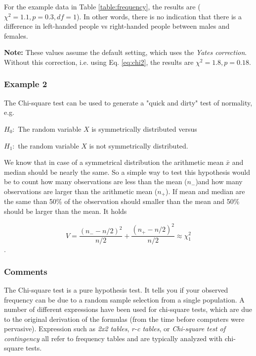 For the example data in Table \ref{table:frequency}, the results are ($\chi^2=1.1, p=0.3, df=1$). In other words, there is no indication that there is a difference in left-handed people vs right-handed people between males and females.

\textbf{Note:} These values assume the default setting, which uses the \emph{Yates correction}. Without this correction, i.e. using Eq. \ref{eq:chi2}, the results are $\chi^2=1.8, p=0.18$.

\subsubsection{Example 2}

The Chi-square test can be used to generate a "quick and dirty" test of normality, e.g.

$H_0:$ The random variable $X$ is symmetrically distributed versus

$H_1:$ the random variable $X$ is not symmetrically distributed.

We know that in case of a symmetrical distribution the arithmetic mean $\bar{x}$ and median should be nearly the same. So a simple way to test this hypothesis would be to count how many observations  are less than the mean ($n_-$)and how many observations are larger than the arithmetic mean ($n_+$). If mean and median are the same than 50\% of the observation should smaller than the mean and 50\% should be larger than the mean. It holds

\begin{equation}
  V = \frac{(n_- - n/2)^2}{n/2} + \frac{(n_+ - n/2)^2}{n/2} \approx \chi^2_1
\end{equation}.


\subsubsection{Comments}


The Chi-square test is a pure hypothesis test. It tells you if your observed frequency can be due to a random sample selection from a single population. A number of different expressions have been used for chi-square tests, which are due to the original derivation of the formulas (from the time before computers were pervasive). Expression such as \emph{2x2 tables}, \emph{r-c tables}, or \emph{Chi-square test of contingency} all refer to frequency tables and are typically analyzed with chi-square tests.


